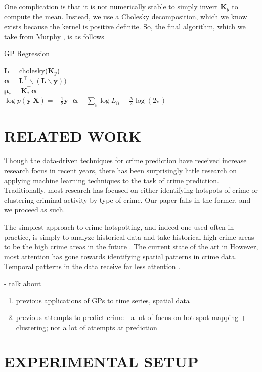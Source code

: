 \documentclass[letterpaper, 12 pt, conference]{ieeeconf}  %
\newcommand{\by}{\textbf{y}}
\newcommand{\bX}{\textbf{X}}
\newcommand{\bK}{\textbf{K}}
\begin{document}
One complication is that it is not numerically stable to simply invert $\bK_y$ to compute the mean. Instead, we use a Cholesky decomposition, which we know exists because the kernel is positive definite. So, the final algorithm, which we take from Murphy \cite{c2}, is as follows
\LinesNumbered
\begin{algorithm}[ht]
  \caption{GP Regression\label{alg}}
  \textbf{L} = cholesky($\bK_y$) \\
  $\bm{\alpha} = \textbf{L}^\top \backslash (\textbf{L} \backslash \by))$ \\
  $\bm{\mu_*} = \bK_*^\top\bm{\alpha} $ \\
  $\log p(\by | \bX) = -\frac{1}{2}\by^\top \bm{\alpha} - \sum_i \log L_{ii} - \frac{N}{2}\log(2\pi)$
\end{algorithm}

\section{RELATED WORK}

Though the data-driven techniques for crime prediction have received increase research focus in recent years, there has been surprisingly little research on applying machine learning techniques to the task of crime prediction. Traditionally, most research has focused on either identifying hotspots of crime or clustering criminal activity by type of crime. Our paper falls in the former, and we proceed as such.

The simplest approach to crime hotspotting, and indeed one used often in practice, is simply to analyze historical data and take historical high crime areas to be the high crime areas in the future \cite{c6}. The current state of the art in However, most attention has gone towards identifying spatial patterns in crime data. Temporal patterns in the data receive far less attention \cite{c5}.

- talk about
\begin{enumerate}
\item previous applications of GPs to time series, spatial data
\item previous attempts to predict crime
- a lot of focus on hot spot mapping + clustering; not a lot of attempts at prediction
\end{enumerate}

\section{EXPERIMENTAL SETUP}
\end{document}
